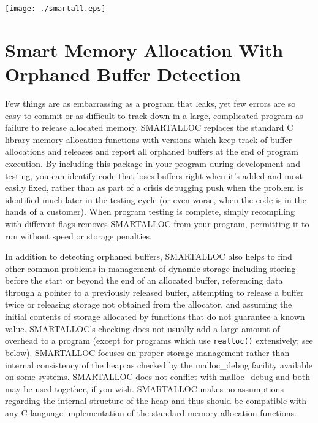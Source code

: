 
\texttt{[image: ./smartall.eps]} 

\section*{Smart Memory Allocation With Orphaned Buffer Detection }
\label{_ChapterStart4}


Few things are as embarrassing as a program that leaks, yet few errors are so
easy to commit or as difficult to track down in a large, complicated program
as failure to release allocated memory. SMARTALLOC replaces the standard C
library memory allocation functions with versions which keep track of buffer
allocations and releases and report all orphaned buffers at the end of program
execution. By including this package in your program during development and
testing, you can identify code that loses buffers right when it's added and
most easily fixed, rather than as part of a crisis debugging push when the
problem is identified much later in the testing cycle (or even worse, when the
code is in the hands of a customer). When program testing is complete, simply
recompiling with different flags removes SMARTALLOC from your program,
permitting it to run without speed or storage penalties. 

In addition to detecting orphaned buffers, SMARTALLOC also helps to find other
common problems in management of dynamic storage including storing before the
start or beyond the end of an allocated buffer, referencing data through a
pointer to a previously released buffer, attempting to release a buffer twice
or releasing storage not obtained from the allocator, and assuming the initial
contents of storage allocated by functions that do not guarantee a known
value. SMARTALLOC's checking does not usually add a large amount of overhead
to a program (except for programs which use {\tt realloc()} extensively; see
below). SMARTALLOC focuses on proper storage management rather than internal
consistency of the heap as checked by the malloc\_debug facility available on
some systems. SMARTALLOC does not conflict with malloc\_debug and both may be
used together, if you wish. SMARTALLOC makes no assumptions regarding the
internal structure of the heap and thus should be compatible with any C
language implementation of the standard memory allocation functions. 


